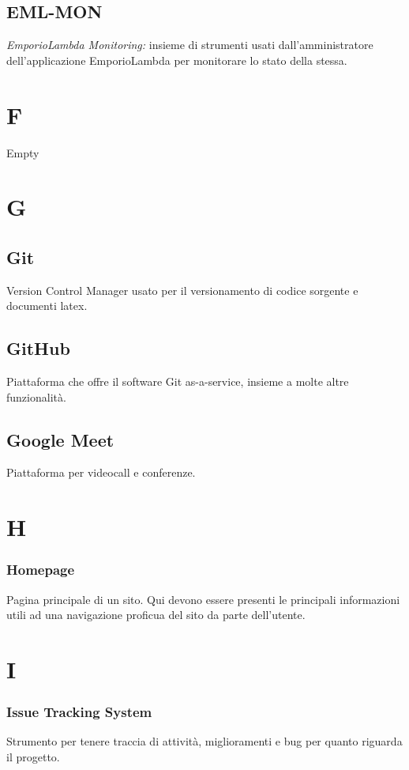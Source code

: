 \subsection*{EML-MON}
\textit{EmporioLambda Monitoring:} insieme di strumenti usati dall'amministratore dell'applicazione EmporioLambda
per monitorare lo stato della stessa.

\section*{F}
Empty

\section*{G}
\subsection*{Git}
Version Control Manager usato per il versionamento di codice sorgente e documenti latex.

\subsection*{GitHub}
Piattaforma che offre il software Git as-a-service, insieme a molte altre funzionalità.

\subsection*{Google Meet}
Piattaforma per videocall e conferenze.

\section*{H}
\subsubsection*{Homepage}
Pagina principale di un sito. Qui devono essere presenti le principali informazioni utili ad una navigazione proficua del
sito da parte dell'utente.

\section*{I}
\subsubsection*{Issue Tracking System}
Strumento per tenere traccia di attività, miglioramenti e bug per quanto riguarda il progetto.

